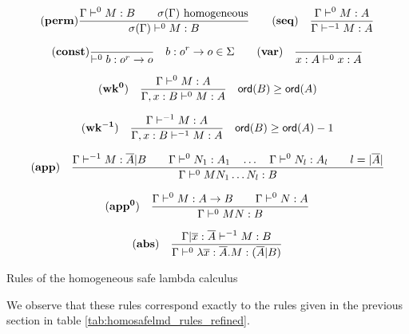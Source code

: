 \begin{table}[htbp]
$$  \mathbf{(perm)}
    \frac{\displaystyle 
       \Gamma \vdash^0 M:B \qquad \sigma(\Gamma)  \hbox{ homogeneous}
    }{ \sigma(\Gamma) \vdash^0 M : B }
\qquad \mathbf{(seq)} \quad \frac{\displaystyle \Gamma \vdash^{0} M : A}{\Gamma
\vdash^{-1} M : A}
$$

$$
 \mathbf{(const)}
    \frac{\displaystyle }{ \vdash^0 b : o^r \rightarrow o} \quad b : o^r \rightarrow o \in \Sigma
\qquad
 \mathbf{(var)} \quad  \frac{\displaystyle }{x : A\vdash^{0} x : A} $$

$$ \mathbf{(wk^{0})} \quad  \frac{\displaystyle \Gamma \vdash^{0} M : A}{\Gamma , x : B \vdash^{0} M : A} \quad {\sf ord}(B) \geq {\sf ord}(A) $$

$$ \mathbf{(wk^{-1})} \quad  \frac{\displaystyle \Gamma \vdash^{-1} M : A}{\Gamma , x : B \vdash^{-1} M : A} \quad {\sf ord}(B) \geq {\sf ord}(A) -1$$

$$ \mathbf{(app)} \quad  \frac{\displaystyle \Gamma \vdash^{-1} M : \overline{A} | B
                                        \qquad \Gamma \vdash^{0} N_1 : A_1
                                        \quad \ldots \quad \Gamma \vdash^{0} N_l : A_l
                                        \qquad l = |\overline{A}|
                                        }{\Gamma  \vdash^{0} M N_1 \ldots N_l : B}
$$


$$ \mathbf{(app^0)} \quad  \frac{\displaystyle \Gamma \vdash^0 M : A\rightarrow B
                                        \qquad \Gamma \vdash^{0} N : A
                                   }{\Gamma  \vdash^{0} M N : B}$$

$$ \mathbf{(abs)} \quad  \frac{\displaystyle \Gamma| \overline{x} : \overline{A} \vdash^{-1} M : B}{\Gamma  \vdash^{0} \lambda \overline{x} : \overline{A} . M : (\overline{A}|B)}$$
\caption{Rules of the homogeneous safe lambda calculus}
\label{tab:homosafelmd_rules}
\end{table}


We observe that these rules correspond exactly to the rules given in the previous section
in table \ref{tab:homosafelmd_rules_refined}.
